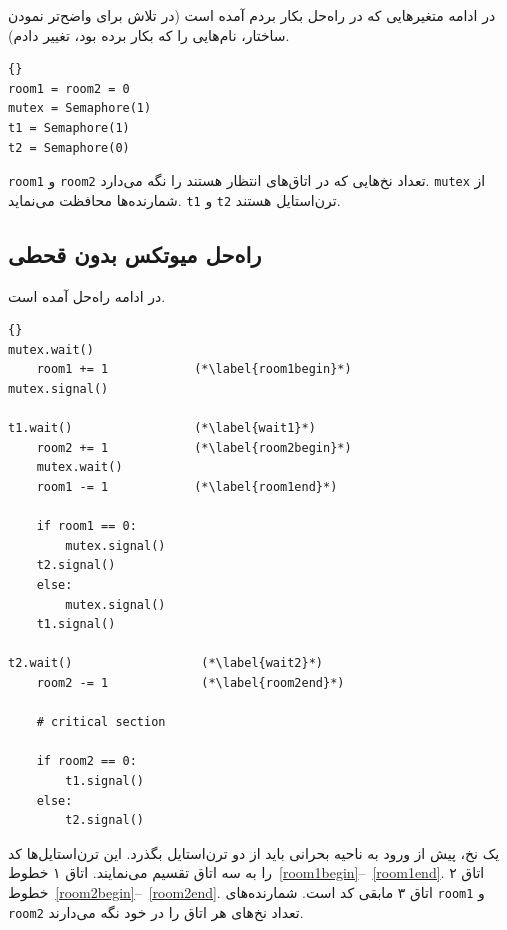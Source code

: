 \documentclass{book}
\newcommand{\clearemptydoublepage}{}%
\begin{document}
    در ادامه متغیرهایی که در راه‌حل بکار بردم آمده است (در تلاش برای واضح‌تر نمودن ساختار، نام‌هایی را که  بکار برده بود، تغییر دادم). 

\begin{latin}
\begin{lstlisting}[title=\rl{راهنمایی میوتکس بدون قحطی}]{}
room1 = room2 = 0
mutex = Semaphore(1)
t1 = Semaphore(1)
t2 = Semaphore(0)
\end{lstlisting}
\end{latin}

    {\tt room1} و  {\tt room2} 
    تعداد نخ‌هایی که در اتاق‌های انتظار هستند را نگه می‌دارد. {\tt mutex} از شمارنده‌ها محافظت می‌نماید. {\tt t1} و {\tt t2}
    ترن‌استایل هستند. 
    


\clearemptydoublepage
\subsection{راه‌حل میوتکس بدون قحطی}

    در ادامه راه‌حل  آمده است. 

\begin{latin}
\begin{lstlisting}[title=\rl{الگوریتم  \lr{Morris}}]{}
mutex.wait()
    room1 += 1            (*\label{room1begin}*)
mutex.signal()
                           
t1.wait()                 (*\label{wait1}*)
    room2 += 1            (*\label{room2begin}*)
    mutex.wait()
    room1 -= 1            (*\label{room1end}*)

    if room1 == 0: 
        mutex.signal()
	t2.signal()
    else: 
        mutex.signal()
	t1.signal()

t2.wait()                  (*\label{wait2}*)
    room2 -= 1             (*\label{room2end}*)

    # critical section

    if room2 == 0:
        t1.signal()
    else:
        t2.signal()
\end{lstlisting}
\end{latin}

    یک نخ، پیش از ورود به ناحیه بحرانی باید از دو ترن‌استایل بگذرد. 
    این ترن‌استایل‌ها کد را به سه اتاق تقسیم می‌نمایند. اتاق ۱ خطوط~\ref{room1begin}--~\ref{room1end}.
    اتاق ۲ خطوط~\ref{room2begin}--~\ref{room2end}. اتاق ۳ مابقی  کد  است. 
    شمارنده‌های {\tt room1} و {\tt room2} تعداد نخ‌های هر اتاق را در خود نگه می‌دارند. 
\end{document}
